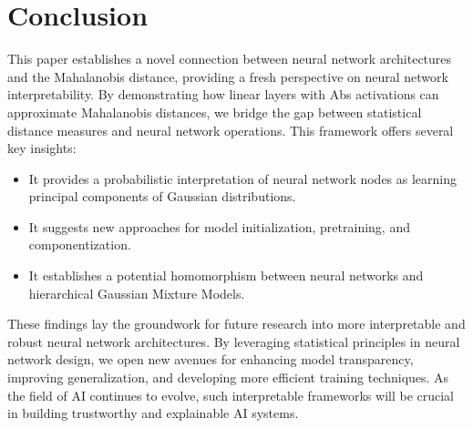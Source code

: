 
\section{Conclusion}
\label{sec:conclusion}

This paper establishes a novel connection between neural network architectures and the Mahalanobis distance, providing a fresh perspective on neural network interpretability. By demonstrating how linear layers with Abs activations can approximate Mahalanobis distances, we bridge the gap between statistical distance measures and neural network operations. This framework offers several key insights:

\begin{itemize}
    \item It provides a probabilistic interpretation of neural network nodes as learning principal components of Gaussian distributions.
    \item It suggests new approaches for model initialization, pretraining, and componentization.
    \item It establishes a potential homomorphism between neural networks and hierarchical Gaussian Mixture Models.
\end{itemize}

These findings lay the groundwork for future research into more interpretable and robust neural network architectures. By leveraging statistical principles in neural network design, we open new avenues for enhancing model transparency, improving generalization, and developing more efficient training techniques. As the field of AI continues to evolve, such interpretable frameworks will be crucial in building trustworthy and explainable AI systems.